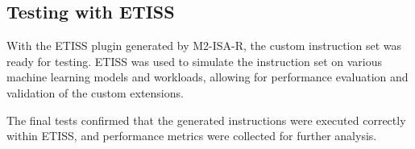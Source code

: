 \subsection{Testing with ETISS}

With the ETISS plugin generated by M2-ISA-R, the custom instruction set was ready for testing. ETISS was used to simulate the instruction set on various machine learning models and workloads, allowing for performance evaluation and validation of the custom extensions.

The final tests confirmed that the generated instructions were executed correctly within ETISS, and performance metrics were collected for further analysis.
